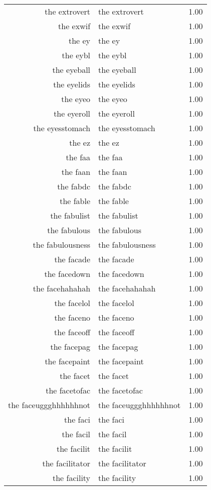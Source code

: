 \begin{table}[ht]
\begin{tabular}{rlr}
  the extrovert & the extrovert & 1.00 \\ 
  the exwif & the exwif & 1.00 \\ 
  the ey & the ey & 1.00 \\ 
  the eybl & the eybl & 1.00 \\ 
  the eyeball & the eyeball & 1.00 \\ 
  the eyelids & the eyelids & 1.00 \\ 
  the eyeo & the eyeo & 1.00 \\ 
  the eyeroll & the eyeroll & 1.00 \\ 
  the eyesstomach & the eyesstomach & 1.00 \\ 
  the ez & the ez & 1.00 \\ 
  the faa & the faa & 1.00 \\ 
  the faan & the faan & 1.00 \\ 
  the fabdc & the fabdc & 1.00 \\ 
  the fable & the fable & 1.00 \\ 
  the fabulist & the fabulist & 1.00 \\ 
  the fabulous & the fabulous & 1.00 \\ 
  the fabulousness & the fabulousness & 1.00 \\ 
  the facade & the facade & 1.00 \\ 
  the facedown & the facedown & 1.00 \\ 
  the facehahahah & the facehahahah & 1.00 \\ 
  the facelol & the facelol & 1.00 \\ 
  the faceno & the faceno & 1.00 \\ 
  the faceoff & the faceoff & 1.00 \\ 
  the facepag & the facepag & 1.00 \\ 
  the facepaint & the facepaint & 1.00 \\ 
  the facet & the facet & 1.00 \\ 
  the facetofac & the facetofac & 1.00 \\ 
  the faceuggghhhhhhnot & the faceuggghhhhhhnot & 1.00 \\ 
  the faci & the faci & 1.00 \\ 
  the facil & the facil & 1.00 \\ 
  the facilit & the facilit & 1.00 \\ 
  the facilitator & the facilitator & 1.00 \\ 
  the facility & the facility & 1.00 \\ 

\end{tabular}
\end{table}
